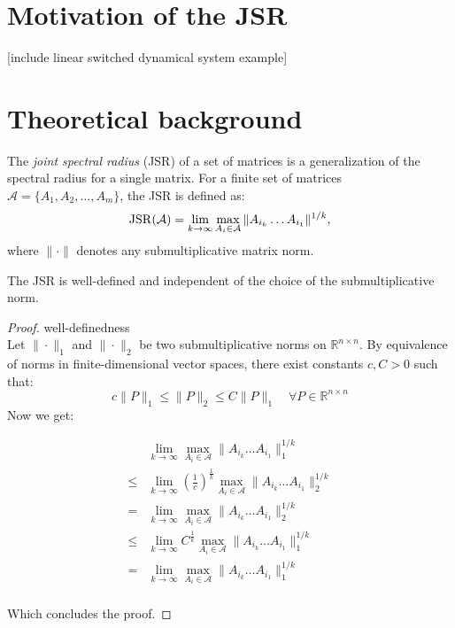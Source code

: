 \section{Motivation of the JSR}
[include linear switched dynamical system example]

\section{Theoretical background}

The \emph{joint spectral radius} (JSR) of a set of matrices is a generalization of the spectral radius for a single matrix. For a finite set of matrices $\mathcal{A} = \{A_1, A_2, \dots, A_m\}$, the JSR is defined as:
\begin{equation}
    \operatorname{JSR}(\mathcal{A}) = \lim_{k \to \infty} \max_{A_i \in \mathcal{A}} \|A_{i_k} \dots A_{i_1}\|^{1/k},
\end{equation}
where $\|\cdot\|$ denotes any submultiplicative matrix norm.

\begin{theorem}
    The JSR is well-defined and independent of the choice of the submultiplicative norm.
\end{theorem}

\begin{proof}{well-definedness\\}
Let $\| \cdot \|_1$   and $ \| \cdot \|_2 $ be two submultiplicative norms on $ \mathbb{R}^{n \times n} $. By equivalence of norms in finite-dimensional vector spaces, there exist constants $ c, C > 0 $ such that:
$$
c \|P\|_1 \leq \|P\|_2 \leq C \|P\|_1 \quad \forall P \in \mathbb{R}^{n \times n}
$$
Now we get: 

\begin{align*}
& \lim_{k \to \infty} \max_{A_i \in \mathcal{A}} \|A_{i_k} \dots A_{i_1}\|_{1}^{1/k} \\
\le & \lim_{k \to \infty} {(\frac{1}{c})}^{\frac{1}{k}} \max_{A_i \in \mathcal{A}} \|A_{i_k} \dots A_{i_1}\|_{2}^{1/k} \\
= & \lim_{k \to \infty} \max_{A_i \in \mathcal{A}} \|A_{i_k} \dots A_{i_1}\|_{2}^{1/k} \\
\le & \lim_{k \to \infty} {C}^{\frac{1}{k}} \max_{A_i \in \mathcal{A}} \|A_{i_k} \dots A_{i_1}\|_{1}^{1/k}\\
= & \lim_{k \to \infty} \max_{A_i \in \mathcal{A}} \|A_{i_k} \dots A_{i_1}\|_{1}^{1/k}\\
\end{align*}

Which concludes the proof.
\end{proof}

